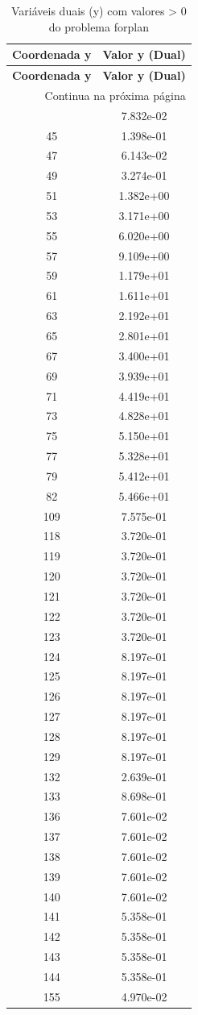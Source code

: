 \documentclass[12pt]{article}
\begin{document}
\begin{longtable}{@{}cc@{}}
\caption{Variáveis duais (y) com valores > 0 do problema forplan} \\
\toprule
\textbf{Coordenada y} & \textbf{Valor y (Dual)} \\
\midrule
\endfirsthead

\toprule
\textbf{Coordenada y} & \textbf{Valor y (Dual)} \\
\midrule
\endhead

\midrule \multicolumn{2}{r}{{Continua na próxima página}} \\ \midrule
\endfoot

\bottomrule
\endlastfoot
25 & 7.832e-02 \\
45 & 1.398e-01 \\
47 & 6.143e-02 \\
49 & 3.274e-01 \\
51 & 1.382e+00 \\
53 & 3.171e+00 \\
55 & 6.020e+00 \\
57 & 9.109e+00 \\
59 & 1.179e+01 \\
61 & 1.611e+01 \\
63 & 2.192e+01 \\
65 & 2.801e+01 \\
67 & 3.400e+01 \\
69 & 3.939e+01 \\
71 & 4.419e+01 \\
73 & 4.828e+01 \\
75 & 5.150e+01 \\
77 & 5.328e+01 \\
79 & 5.412e+01 \\
82 & 5.466e+01 \\
109 & 7.575e-01 \\
118 & 3.720e-01 \\
119 & 3.720e-01 \\
120 & 3.720e-01 \\
121 & 3.720e-01 \\
122 & 3.720e-01 \\
123 & 3.720e-01 \\
124 & 8.197e-01 \\
125 & 8.197e-01 \\
126 & 8.197e-01 \\
127 & 8.197e-01 \\
128 & 8.197e-01 \\
129 & 8.197e-01 \\
132 & 2.639e-01 \\
133 & 8.698e-01 \\
136 & 7.601e-02 \\
137 & 7.601e-02 \\
138 & 7.601e-02 \\
139 & 7.601e-02 \\
140 & 7.601e-02 \\
141 & 5.358e-01 \\
142 & 5.358e-01 \\
143 & 5.358e-01 \\
144 & 5.358e-01 \\
155 & 4.970e-02 \\

\bottomrule
\end{longtable}
\end{document}
